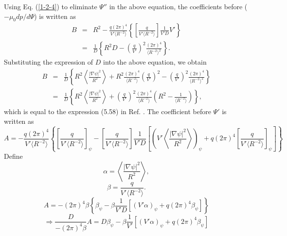 \documentclass{article}
\begin{document}
Using Eq. (\ref{1-2-4}) to eliminate $\Psi''$ in the above equation, the
coefficients before ($- \mu_0 d p / d \Psi$) is written as
\begin{eqnarray}
  B & = & R^2 - \frac{q (2 \pi)^4}{V' \langle R^{- 2} \rangle} \left\{ \left[
  \frac{q}{V' \langle R^{- 2} \rangle} \right] \frac{1}{V' D} V' \right\}
  \nonumber\\
  & = & \frac{1}{D} \left\{ R^2 D - \left( \frac{q}{V'} \right)^2 \frac{(2
  \pi)^4}{\langle R^{- 2} \rangle^2} \right\} . 
\end{eqnarray}
Substituting the expression of $D$ into the above equation, we obtain
\begin{eqnarray}
  B & = & \frac{1}{D} \left\{ R^2 \left\langle \frac{| \nabla \psi |^2}{R^2}
  \right\rangle + R^2 \frac{(2 \pi)^4}{\langle R^{- 2} \rangle} \left(
  \frac{q}{V'} \right)^2 - \left( \frac{q}{V'} \right)^2 \frac{(2
  \pi)^4}{\langle R^{- 2} \rangle^2} \right\} \nonumber\\
  & = & \frac{1}{D} \left\{ R^2 \left\langle \frac{| \nabla \psi |^2}{R^2}
  \right\rangle + \left( \frac{q}{V'} \right)^2 \frac{(2 \pi)^4}{\langle R^{-
  2} \rangle} \left( R^2 - \frac{1}{\langle R^{- 2} \rangle} \right) \right\},
  \label{4-19-1}
\end{eqnarray}
which is equal to the expression (5.58) in Ref. {\cite{jardin2010}}. The
coefficient before $\Psi'$ is written as
\[ A = - \frac{q (2 \pi)^4}{V' \langle R^{- 2} \rangle} \left\{ \left[
   \frac{q}{V' \langle R^{- 2} \rangle} \right]_{\psi} - \left[ \frac{q}{V'
   \langle R^{- 2} \rangle} \right] \frac{1}{V' D} \left[ \left( V'
   \left\langle \frac{| \nabla \psi |^2}{R^2} \right\rangle \right)_{\psi} + q
   (2 \pi)^4 \left[ \frac{q}{V' \langle R^{- 2} \rangle} \right]_{\psi}
   \right] \right\} \]
Define
\[ \alpha = \left\langle \frac{| \nabla \psi |^2}{R^2} \right\rangle, \]
\[ \beta = \frac{q}{V' \langle R^{- 2} \rangle} . \]
\[ A = - (2 \pi)^4 \beta \left\{ \beta_{\psi} - \beta \frac{1}{V' D} [(V'
   \alpha)_{\psi} + q (2 \pi)^4 \beta_{\psi}] \right\} \]
\begin{equation}
  \Longrightarrow \frac{D}{- (2 \pi)^4 \beta} A = D \beta_{\psi} - \beta
  \frac{1}{V'} [(V' \alpha)_{\psi} + q (2 \pi)^4 \beta_{\psi}]
\end{equation}
\end{document}
